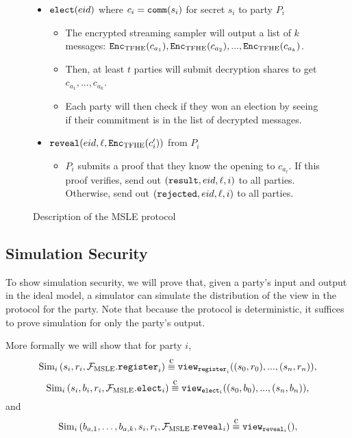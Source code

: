 \begin{figure}
{\begin{minipage}{1\textwidth}
\begin{itemize}
				\item $\texttt{elect}({eid})$ where $c_i = \texttt{comm}(s_i)$ for secret $s_i$ to party $P_i$
				      \begin{itemize}
					      \item The encrypted streaming sampler will output a list of $k$ messages: $\texttt{Enc}_{\mathrm{TFHE}}(c_{a_1}), \texttt{Enc}_{\mathrm{TFHE}}(c_{a_2}), ..., \texttt{Enc}_{\mathrm{TFHE}}(c_{a_k})$.
					      \item Then, at least $t$ parties will submit decryption shares to get $c_{a_1}, ..., c_{a_k}$.
					      \item Each party will then check if they won an election by seeing if their commitment is in the list of decrypted messages.
				      \end{itemize}
				\item $\texttt{reveal}({eid}, \ell, \texttt{Enc}_{\mathrm{TFHE}}(c'_i))$ from $P_i$
				      \begin{itemize}
					      \item $P_i$ submits a proof that they know the opening to $c_{a_\ell}$.
					            If this proof verifies, send out $(\texttt{result}, {eid}, \ell, i)$ to all parties.
					            Otherwise, send out $(\texttt{rejected}, {eid}, \ell, i)$ to all parties.
				      \end{itemize}
			\end{itemize}
		\end{minipage}
	}
	\caption{Description of the MSLE protocol}
	\label{fig:protocolMSLE}
\end{figure}

\subsection{Simulation Security}
To show simulation security, we will prove that, given a party's input and output in the ideal model,
a simulator can simulate the distribution of the view in the protocol for the party. Note that because the
protocol is deterministic, it suffices to prove simulation for only the party's output.

More formally we will show that for party $i$,
\begin{equation}
	\label{eq:simSecReg}
	\simulator_i\left(s_i, r_i, \idealMSLE.\register_i\right) \compInd \texttt{view}_{\register_i}((s_0, r_0), ..., (s_n, r_n)),
\end{equation}
\begin{equation}
	\label{eq:simSecElect}
	\simulator_i\left(s_i, b_i, r_i, \idealMSLE.\elect_i\right) \compInd \texttt{view}_{\elect_i}((s_0, b_0), ..., (s_n, b_n)),
\end{equation}
and
\begin{equation}
	\label{eq:simSecReveal}
	\simulator_i\left(b_{a, 1}, \dots, b_{a, k}, s_i, r_i, \idealMSLE.\reveal_i\right) \compInd \texttt{view}_{\reveal_i}(),
\end{equation}

